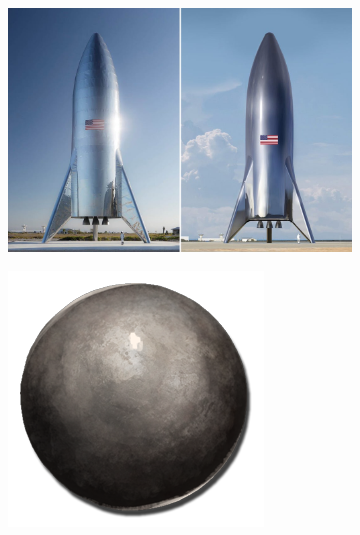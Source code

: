 \documentclass{article}
\begin{document}
\begin{figure}[h!]
  \centering
  \begin{subfigure}[b]{0.2\linewidth}
    \includegraphics[width=\linewidth]{heat_equation_article/img/rocket.jpg}
  \end{subfigure}
  \begin{subfigure}[b]{0.2\linewidth}
    \includegraphics[width=\linewidth]{heat_equation_article/img/Cannon_Ball.png}
  \end{subfigure}
\end{figure}
\end{document}
